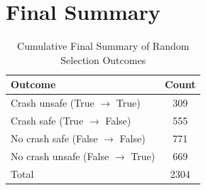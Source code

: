\documentclass{article}
\begin{document}
\section{Final Summary}

\begin{table}[h]
\centering
\caption{Cumulative Final Summary of Random Selection Outcomes}
\begin{tabular}{lc}
\toprule
Outcome & Count \\
\midrule
Crash unsafe (True $\rightarrow$ True) & 309 \\ 
Crash safe (True $\rightarrow$ False) & 555 \\ 
No crash safe (False $\rightarrow$ False) & 771 \\ 
No crash unsafe (False $\rightarrow$ True) & 669 \\ 
\midrule
Total & 2304 \\ 
\bottomrule
\end{tabular}
\end{table}
\end{document}
